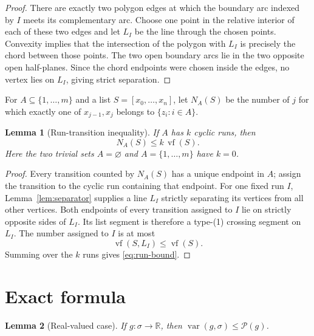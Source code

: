 \documentclass[11pt]{article}
\newtheorem{lemma}{Lemma}
\newcommand{\R}{\mathbb R}
\newcommand{\vf}{\operatorname{vf}}
\newcommand{\Var}{\operatorname{var}}
\newcommand{\Per}{\mathcal P}
\begin{document}
\begin{proof}
There are exactly two polygon edges at which the boundary arc indexed by $I$
meets its complementary arc.  Choose one point in the relative interior of
each of these two edges and let $L_I$ be the line through the chosen points.
Convexity implies that the intersection of the polygon with $L_I$ is precisely
the chord between those points.  The two open boundary arcs lie in the two
opposite open half-planes.  Since the chord endpoints were chosen inside the
edges, no vertex lies on $L_I$, giving strict separation.
\end{proof}

For $A\subseteq\{1,\ldots,m\}$ and a list $S=[x_0,\ldots,x_n]$, let
$N_A(S)$ be the number of $j$ for which exactly one of $x_{j-1},x_j$ belongs
to $\{z_i:i\in A\}$.

\begin{lemma}[Run-transition inequality]
\label{lem:runs}
If $A$ has $k$ cyclic runs, then
\begin{equation}
 N_A(S)\leq k\,\vf(S).
 \label{eq:run-bound}
\end{equation}
Here the two trivial sets $A=\varnothing$ and
$A=\{1,\ldots,m\}$ have $k=0$.
\end{lemma}

\begin{proof}
Every transition counted by $N_A(S)$ has a unique endpoint in $A$; assign the
transition to the cyclic run containing that endpoint.  For one fixed run
$I$, Lemma~\ref{lem:separator} supplies a line $L_I$ strictly separating its
vertices from all other vertices.  Both endpoints of every transition
assigned to $I$ lie on strictly opposite sides of $L_I$.  Its list segment is
therefore a type-(1) crossing segment on $L_I$.  The number assigned to $I$
is at most
\[
 \vf(S,L_I)\leq\vf(S).
\]
Summing over the $k$ runs gives \eqref{eq:run-bound}.
\end{proof}

\section{Exact formula}

\begin{lemma}[Real-valued case]
\label{lem:real}
If $g:\sigma\to\R$, then $\Var(g,\sigma)\leq\Per(g)$.
\end{lemma}
\end{document}
